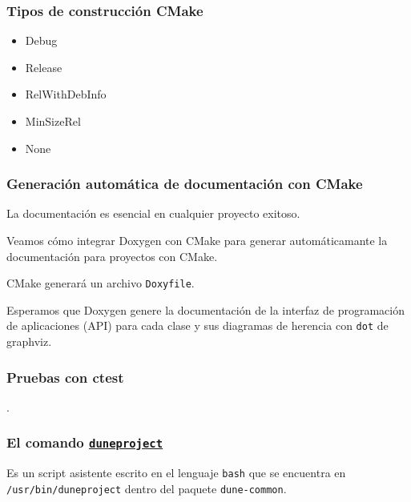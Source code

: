 \begin{frame}[fragile]
	\frametitle{Tipos de construcción CMake}

	\begin{itemize}
		\item
		
		Debug

		\item
		
		Release

		\item
		
		RelWithDebInfo

		\item
		
		MinSizeRel

		\item
		
		None
	\end{itemize}
\end{frame}

\begin{frame}[fragile]
	\frametitle{Generación automática de documentación con CMake}
	La documentación es esencial en cualquier proyecto exitoso.

	Veamos cómo integrar Doxygen con CMake para generar
	automáticamante la documentación para proyectos con CMake.

	CMake generará un archivo \lstinline{Doxyfile}.

	Esperamos que Doxygen genere la documentación de la interfaz de
	programación de aplicaciones (API) para cada clase y sus
	diagramas de herencia con \lstinline{dot} de graphviz.
\end{frame}

\begin{frame}[fragile]
	\frametitle{Pruebas con ctest}
	.
\end{frame}



\begin{frame}[fragile]
	\frametitle{El comando \href{https://gitlab.dune-project.org/core/dune-common/-/raw/master/bin/duneproject}{\lstinline{duneproject}}}

	Es un script asistente escrito en el lenguaje \lstinline{bash}
	que se encuentra en \lstinline{/usr/bin/duneproject}
	dentro del paquete \lstinline{dune-common}.
\end{frame}

